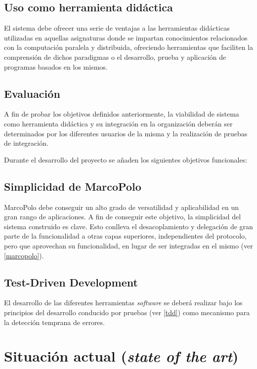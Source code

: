 \subsection{Uso como herramienta didáctica}

El sistema debe ofrecer una serie de ventajas a las herramientas didácticas utilizadas en aquellas asignaturas donde se impartan conocimientos relacionados con la computación paralela y distribuida, ofreciendo herramientas que faciliten la comprensión de dichos paradigmas o el desarrollo, prueba y aplicación de programas basados en los mismos.

\subsection{Evaluación}

A fin de probar los objetivos definidos anteriormente, la viabilidad de sistema como herramienta didáctica y su integración en la organización deberán ser determinados por los diferentes usuarios de la misma y la realización de pruebas de integración.

Durante el desarrollo del proyecto se añaden los siguientes objetivos funcionales:

\subsection{Simplicidad de MarcoPolo}

MarcoPolo debe conseguir un alto grado de versatilidad y aplicabilidad en un gran rango de aplicaciones. A fin de conseguir este objetivo, la simplicidad del sistema construido es clave. Esto conlleva el desacoplamiento y delegación de gran parte de la funcionalidad a otras capas superiores, independientes del protocolo, pero que aprovechan su funcionalidad, en lugar de ser integradas en el mismo (ver \ref{marcopolo}).

\subsection{Test-Driven Development}

El desarrollo de las diferentes herramientas \textit{software} se deberá realizar bajo los principios del desarrollo conducido por pruebas (ver \ref{tdd}) como mecanismo para la detección temprana de errores.

\section{Situación actual (\textit{state of the art})}

